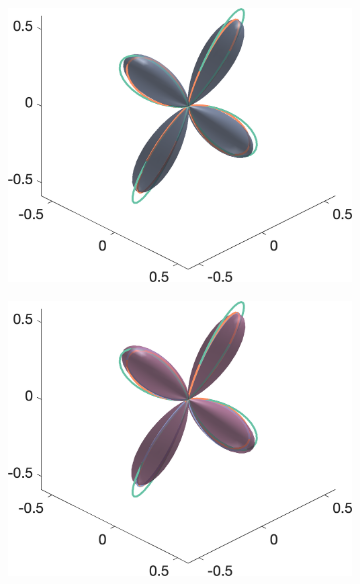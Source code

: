 \begin{figure}
{\begin{minipage}[c]{\textwidth}
\begin{subfigure}[]{0.245\textwidth}
  \end{subfigure}
  \begin{subfigure}[]{0.245\textwidth}
    \includegraphics[width=\textwidth]{figures/frf_experiment/twoperp_fod_3D_b_3000n_3}
  \end{subfigure}
  \begin{subfigure}[]{0.245\textwidth}
    \includegraphics[width=\textwidth]{figures/frf_experiment/twoperp_fod_3D_b_3000n_4_f1}
  \end{subfigure}
  \end{minipage}
}
\end{figure}
